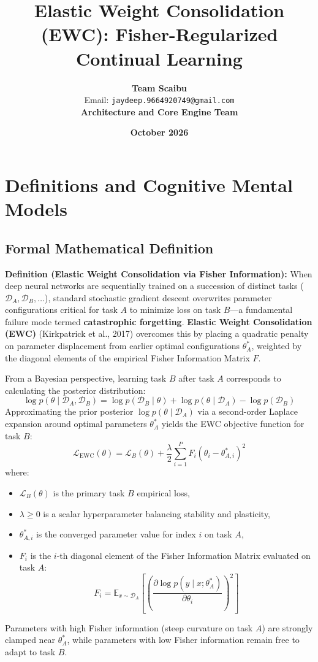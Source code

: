 \documentclass[11pt,a4paper]{article}
\title{\textbf{Elastic Weight Consolidation (EWC): Fisher-Regularized Continual Learning}}
\author{\textbf{Team Scaibu} \\ \small Email: \texttt{jaydeep.9664920749@gmail.com} \\ \small \textbf{Architecture and Core Engine Team}}
\date{\textbf{October 2026}}
\theoremstyle{definition}
\begin{document}
\maketitle

\section{Definitions and Cognitive Mental Models}

\subsection{Formal Mathematical Definition}
\textbf{Definition (Elastic Weight Consolidation via Fisher Information):}
When deep neural networks are sequentially trained on a succession of distinct tasks ($\mathcal{D}_A, \mathcal{D}_B, \dots$), standard stochastic gradient descent overwrites parameter configurations critical for task $A$ to minimize loss on task $B$—a fundamental failure mode termed \textbf{catastrophic forgetting}. \textbf{Elastic Weight Consolidation (EWC)} (Kirkpatrick et al., 2017) overcomes this by placing a quadratic penalty on parameter displacement from earlier optimal configurations $\theta_A^*$, weighted by the diagonal elements of the empirical Fisher Information Matrix $F$.

From a Bayesian perspective, learning task $B$ after task $A$ corresponds to calculating the posterior distribution:
{\boldmath
\begin{equation}
\log p(\theta \mid \mathcal{D}_A, \mathcal{D}_B) = \log p(\mathcal{D}_B \mid \theta) + \log p(\theta \mid \mathcal{D}_A) - \log p(\mathcal{D}_B)
\end{equation}
}
Approximating the prior posterior $\log p(\theta \mid \mathcal{D}_A)$ via a second-order Laplace expansion around optimal parameters $\theta_A^*$ yields the EWC objective function for task $B$:
{\boldmath
\begin{equation}
\mathcal{L}_{\text{EWC}}(\theta) = \mathcal{L}_B(\theta) + \frac{\lambda}{2} \sum_{i=1}^P F_i \left( \theta_i - \theta_{A, i}^* \right)^2
\end{equation}
}
where:
\begin{itemize}
    \item $\mathcal{L}_B(\theta)$ is the primary task $B$ empirical loss,
    \item $\lambda \ge 0$ is a scalar hyperparameter balancing stability and plasticity,
    \item $\theta_{A, i}^*$ is the converged parameter value for index $i$ on task $A$,
    \item $F_i$ is the $i$-th diagonal element of the Fisher Information Matrix evaluated on task $A$:
    {\boldmath
    \begin{equation}
    F_i = \mathbb{E}_{x \sim \mathcal{D}_A} \left[ \left( \frac{\partial \log p(y \mid x; \theta_A^*)}{\partial \theta_i} \right)^2 \right]
    \end{equation}
    }
\end{itemize}
Parameters with high Fisher information (steep curvature on task $A$) are strongly clamped near $\theta_A^*$, while parameters with low Fisher information remain free to adapt to task $B$.
\end{document}
